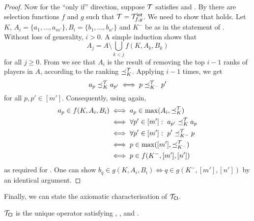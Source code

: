 \begin{proof}
    Now for the ``only if'' direction, suppose $\mathcal{T}$ satisfies
    \chaindef{} and \rankremoval{}. By
     there are selection functions
    $f$ and $g$ such that $\mathcal{T} = {\mathcal{T}_{f, g}^\mathsf{int}}$. We need to show that
    \smi{} holds. Let $K$, $A_i = \{a_1, \ldots, a_{m'}\}, B_i = \{b_1,
    \ldots, b_{n'}\}$ and $K^-$ be as in the statement of \smi{}.
    Without loss of generality, $i > 0 $. A simple induction shows that
    \[
        A_j = A \setminus \bigcup_{k < j}{f(K, A_k, B_k)}
    \]
    for all $j \ge 0$. From  we see
    that $A_i$ is the result of removing the top $i - 1$ ranks of players in
    $A$, according to the ranking $\preceq_K^{\mathcal{T}}$. Applying
    \rankremoval{} $i - 1$ times, we get
    \[
        a_p \preceq_K^{\mathcal{T}} a_{p'}
        \iff p \preceq_{K^-}^{\mathcal{T}} p'
    \]
    for all $p, p' \in [m']$. Consequently, using
     again,
    \begin{align*}
        a_p \in f(K, A_i, B_i)
        &\iff a_p \in \max(A_i, {\preceq_K^{\mathcal{T}}}) \\
        &\iff \forall p' \in [m']:\ a_{p'} \preceq_K^{\mathcal{T}} a_p \\
        &\iff \forall p' \in [m']:\ p' \preceq_{K^-}^{\mathcal{T}} p \\
        &\iff p \in \max([m'], {\preceq_{K^-}^{\mathcal{T}}}) \\
        &\iff p \in f(K^-, [m'], [n'])
    \end{align*}
    as required for \smi{}. One can show $b_q \in g(K, A_i, B_i) \iff q
    \in g(K^-, [m'], [n'])$ by an identical argument.
\end{proof}

Finally, we can state the axiomatic characterisation of ${\mathcal{T}_{\mathsf{CI}}}$.

\begin{theorem}
    ${\mathcal{T}_{\mathsf{CI}}}$ is the unique operator satisfying \dualaxiom{},
    \chaindef{}, \rankremoval{} and \argmaxaxiom{}.
\end{theorem}

